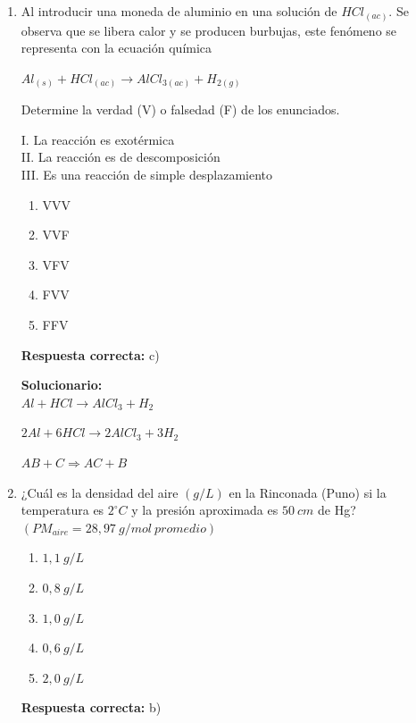 \begin{enumerate}
	\vspace{2mm}
	\textbf{Solucionario:}\\
	
	$^A_Z E+\,_0 n^1 \rightarrow\, _{79}Au^{198}+_1 H^1$
	
	$\Sigma Z=Z+0=79+1$
	
	
	\vspace{6mm}
	
	\item Al introducir una moneda de aluminio en una solución de $HCl_{(ac)}$. Se observa que se libera calor y se producen burbujas, este fenómeno se representa con la ecuación química
	
	$Al_{(s)}+HCl_{(ac)}\rightarrow AlCl_{3(ac)}+H_{2(g)}$
	
	Determine la verdad (V) o falsedad (F) de los enunciados.
	
	I. La reacción es exotérmica\\
	II. La reacción es de descomposición\\
	III. Es una reacción de simple desplazamiento
	
	\begin{enumerate}[label=\alph*)]
		\item VVV
		\item VVF
		\item VFV
		\item FVV
		\item FFV
	\end{enumerate}
	\textbf{Respuesta correcta:} c)
	
	\vspace{2mm}
	\textbf{Solucionario:}\\
	
	$Al+HCl\rightarrow AlCl_3+H_2$
	
	$2Al+6HCl\rightarrow 2AlCl_3+3H_2$
	
	$AB+C\Rightarrow AC+B$
	
	\vspace{6mm}
	
	\item ¿Cuál es la densidad del aire $(g/L)$ en la Rinconada (Puno) si la temperatura es $2^\circ C$ y la presión aproximada es $50\ cm$ de Hg? $(PM_{aire}=28,97\ g/mol\ promedio)$
	
	\begin{enumerate}[label=\alph*)]
		\item $1,1\ g/L$
		\item $0,8\ g/L$
		\item $1,0\ g/L$
		\item $0,6\ g/L$
		\item $2,0\ g/L$
	\end{enumerate}
	\textbf{Respuesta correcta:} b)
	

\end{enumerate}
